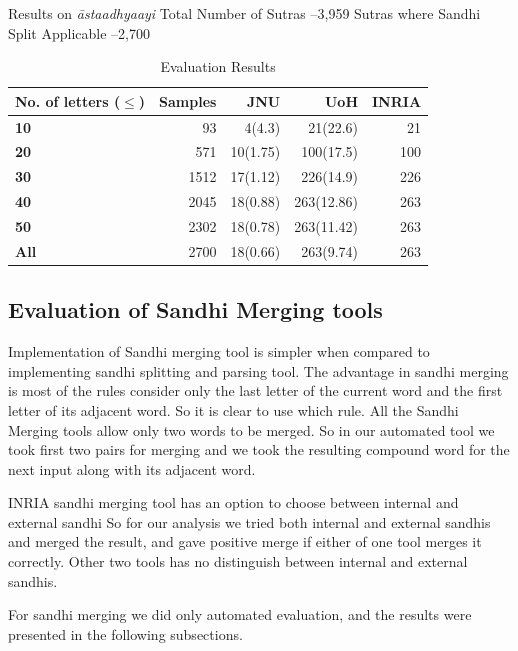 \documentclass[11pt]{article}
\begin{document}
Results on \textit{\={a}staadhyaayi}
Total Number of Sutras –3,959
Sutras where Sandhi Split Applicable –2,700
    


\begin{table}[h]
\begin{center}
\begin{tabular}{ p{2cm}  r r r r }
\hline  
\bf No. of letters ($\le$) & Samples & JNU & UoH & INRIA\\
\hline
\bf	10	&	93	&	4(4.3)	&	21(22.6)	&	21	\\
\bf	20	&	571	&	10(1.75)	&	100(17.5)	&	100	\\
\bf	30	&	1512	&	17(1.12)	&	226(14.9)	&	226	\\
\bf	40	&	2045	&	18(0.88)	&	263(12.86)	&	263	\\
\bf	50	&	2302	&	18(0.78)	&	263(11.42)	&	263	\\
\bf	All	&	2700	&	18(0.66)	&	263(9.74)	&	263	\\
\hline
\end{tabular}
\end{center}
\caption{\label{font-table} Evaluation Results }
\end{table}


\subsection{Evaluation of Sandhi Merging tools}

Implementation of Sandhi merging tool is simpler when compared to implementing sandhi splitting and parsing tool. The advantage in sandhi merging is most of the rules consider only the last letter of the current word and the first letter of its adjacent word. So it is clear to use which rule. All the Sandhi Merging tools allow only two words to be merged. So in our automated tool we took first two pairs for merging and we took the resulting compound word for the next input along with its adjacent word. 

INRIA sandhi merging tool has an option to choose between internal and external sandhi So for our analysis we tried both internal and external sandhis and merged the result, and gave positive merge if either of one tool merges it correctly. Other two tools has no distinguish between internal and external sandhis.

For sandhi merging we did only automated evaluation, and the results were presented in the following subsections.
\end{document}
